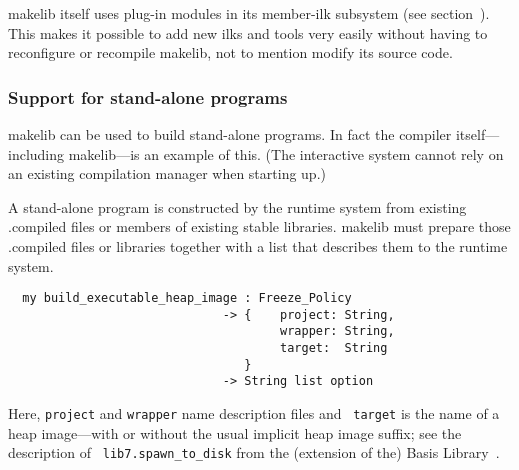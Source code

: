 makelib itself uses plug-in modules in its member-ilk subsystem (see
section~).  This makes it possible to add new ilks
and tools very easily without having to reconfigure or recompile makelib,
not to mention modify its source code.

\subsubsection{Support for stand-alone programs}
\label{sec:build-an-executable-mythryl-heap-image:support}

makelib can be used to build stand-alone programs. In fact the compiler
itself---including makelib---is an example of this.  (The interactive
system cannot rely on an existing compilation manager when starting
up.)

A stand-alone program is constructed by the runtime system from
existing .compiled files or members of existing stable libraries.  makelib must
prepare those .compiled files or libraries together with a list that
describes them to the runtime system.

\begin{verbatim}
  my build_executable_heap_image : Freeze_Policy
                              -> {    project: String,
                                      wrapper: String,
                                      target:  String
                                 }
                              -> String list option
\end{verbatim}

Here, {\tt project} and {\tt wrapper} name description files and {\tt
target} is the name of a heap image---with or without the usual
implicit heap image suffix; see the description of {\tt
lib7.spawn_to_disk} from the (extension of the) Basis
Library~\cite{reppy99:basis}.

